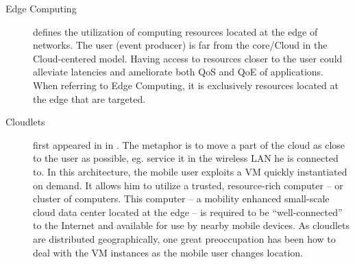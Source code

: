 \documentclass[11pt]{sdm}
\begin{document}
\begin{description}
	\item[Edge Computing] defines the utilization of computing resources located at the edge of networks. The user (event producer) is far from the core/Cloud in the Cloud-centered model. Having access to resources closer to the user could alleviate latencies and ameliorate both \gls{QoS} and \gls{QoE} of applications. When referring to Edge Computing, it is exclusively resources located at the edge that are targeted.
		
	\item[Cloudlets] first appeared in \cite{satyanarayanan_case_2009} in . The metaphor is to move a part of the cloud as close to the user as possible, eg. service it in the wireless LAN he is connected to. In this architecture, the mobile user exploits a \gls{VM} quickly instantiated on demand. It allows him to utilize a trusted, resource-rich computer -- or cluster of computers. This computer -- a mobility enhanced small-scale cloud data center located at the edge -- is required to be ``well-connected'' to the Internet and available for use by nearby mobile devices. As cloudlets are distributed geographically, one great preoccupation has been how to deal with the \gls{VM} instances as the mobile user changes location.
	

\end{description}
\end{document}
